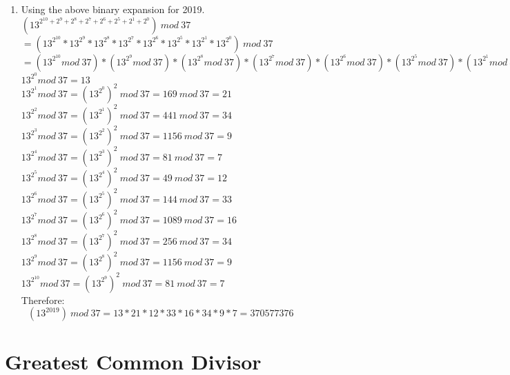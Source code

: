 \documentclass[11pt]{article}
\begin{document}
\begin{enumerate}
\item
Using the above binary expansion for 2019.\\
$ (13^{2^{10} + 2^9 + 2^8 + 2^7 + 2^6 + 2^5 + 2^1 + 2^0})~ mod~ 37 $\\
$ = (13^{2^{10}} * 13^{2^9} * 13^{2^8} * 13^{2^7} * 13^{2^6} * 13^{2^5} * 13^{2^1} * 13^{2^0}) ~mod~ 37 $\\
$ = (13^{2^{10}} mod~ 37) * (13^{2^9} mod~ 37) * (13^{2^8} mod~ 37) * (13^{2^7} mod~ 37) * (13^{2^6} mod~ 37) * (13^{2^5} mod~ 37) * (13^{2^1} mod~ 37) * (13^{2^0} mod~ 37) $\\
$ 13^{2^0} mod~ 37 = 13$\\
$ 13^{2^1} mod~ 37 = (13^{2^0})^2 ~mod~ 37 = 169 ~mod~ 37 = 21  $\\
$ 13^{2^2} mod~ 37 = (13^{2^1})^2 ~mod~ 37 = 441 ~mod~ 37 = 34  $\\
$ 13^{2^3} mod~ 37 = (13^{2^2})^2 ~mod~ 37 = 1156 ~mod~ 37 = 9  $\\
$ 13^{2^4} mod~ 37 = (13^{2^3})^2 ~mod~ 37 = 81 ~mod~ 37 = 7  $\\
$ 13^{2^5} mod~ 37 = (13^{2^4})^2 ~mod~ 37 = 49 ~mod~ 37 = 12  $\\
$ 13^{2^6} mod~ 37 = (13^{2^5})^2 ~mod~ 37 = 144 ~mod~ 37 = 33  $\\
$ 13^{2^7} mod~ 37 = (13^{2^6})^2 ~mod~ 37 = 1089 ~mod~ 37 = 16  $\\
$ 13^{2^8} mod~ 37 = (13^{2^7})^2 ~mod~ 37 = 256 ~mod~ 37 = 34  $\\
$ 13^{2^9} mod~ 37 = (13^{2^8})^2 ~mod~ 37 = 1156 ~mod~ 37 = 9  $\\
$ 13^{2^{10}} mod~ 37 = (13^{2^9})^2 ~mod~ 37 = 81 ~mod~ 37 = 7  $\\
Therefore: \\
$ ~~~(13^{2019}) ~mod~ 37 = 13 * 21 *12 * 33 * 16 * 34 * 9 * 7 = 370577376 $\\

\end{enumerate}

\section{Greatest Common Divisor}
\end{document}

